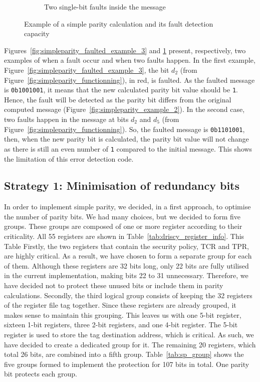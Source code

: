 \begin{figure}[ht]
\begin{subfigure}[b]{0.49\textwidth}
        \caption{Two single-bit faults inside the message}
        \label{fig:simpleparity_faulted_example_4}
    \end{subfigure}
    \caption{Example of a simple parity calculation and its fault detection capacity}
    \label{fig:simpleparity_example}
\end{figure}

Figures~\ref{fig:simpleparity_faulted_example_3} and \ref{fig:simpleparity_faulted_example_4} present, respectively, two examples of when a fault occur and when two faults happen.
In the first example, Figure~\ref{fig:simpleparity_faulted_example_3}, the bit $d_2$ (from Figure~\ref{fig:simpleparity_functionning}), in red, is faulted. As the faulted message is \texttt{0b1001001}, it means that the new calculated parity bit value should be \texttt{1}. Hence, the fault will be detected as the parity bit differs from the original computed message (Figure~\ref{fig:simpleparity_example_2}).
In the second case, two faults happen in the message at bits $d_2$ and $d_5$ (from Figure~\ref{fig:simpleparity_functionning}). So, the faulted message is \texttt{0b1101001}, then, when the new parity bit is calculated, the parity bit value will not change as there is still an even number of \texttt{1} compared to the initial message. This shows the limitation of this error detection code.

\subsection{Strategy 1: Minimisation of redundancy bits}

In order to implement simple parity, we decided, in a first approach, to optimise the number of parity bits. We had many choices, but we decided to form five groups. These groups are composed of one or more register according to their criticality. All 55 registers are shown in Table~\ref{tab:driscy_register_info}. This Table
Firstly, the two registers that contain the security policy, TCR and TPR, are highly critical. As a result, we have chosen to form a separate group for each of them. Although these registers are 32 bits long, only 22 bits are fully utilised in the current implementation, making bits 22 to 31 unnecessary. Therefore, we have decided not to protect these unused bits or include them in parity calculations.
Secondly, the third logical group consists of keeping the 32 registers of the register file tag together. Since these registers are already grouped, it makes sense to maintain this grouping.
This leaves us with one 5-bit register, sixteen 1-bit registers, three 2-bit registers, and one 4-bit register. The 5-bit register is used to store the tag destination address, which is critical. As such, we have decided to create a dedicated group for it. The remaining 20 registers, which total 26 bits, are combined into a fifth group.
Table~\ref{tab:sp_group} shows the five groups formed to implement the protection for 107 bits in total. One parity bit protects each group.

